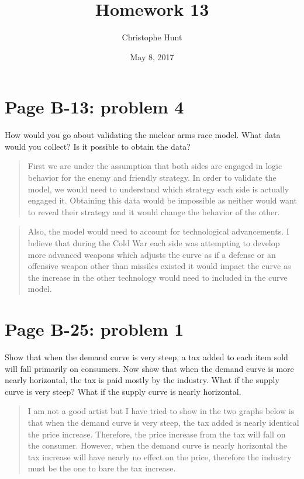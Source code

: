 \documentclass[]{article}
\title{Homework 13}
\author{Christophe Hunt}
\date{May 8, 2017}
\begin{document}
\maketitle

{
\setcounter{tocdepth}{2}
\tableofcontents
}
\newpage

\section{Page B-13: problem 4}\label{page-b-13-problem-4}

How would you go about validating the nuclear arms race model. What data
would you collect? Is it possible to obtain the data?

\begin{quote}
First we are under the assumption that both sides are engaged in logic
behavior for the enemy and friendly strategy. In order to validate the
model, we would need to understand which strategy each side is actually
engaged it. Obtaining this data would be impossible as neither would
want to reveal their strategy and it would change the behavior of the
other.
\end{quote}

\begin{quote}
Also, the model would need to account for technological advancements. I
believe that during the Cold War each side was attempting to develop
more advanced weapons which adjusts the curve as if a defense or an
offensive weapon other than missiles existed it would impact the curve
as the increase in the other technology would need to included in the
curve model.
\end{quote}

\section{Page B-25: problem 1}\label{page-b-25-problem-1}

Show that when the demand curve is very steep, a tax added to each item
sold will fall primarily on consumers. Now show that when the demand
curve is more nearly horizontal, the tax is paid mostly by the industry.
What if the supply curve is very steep? What if the supply curve is
nearly horizontal.

\begin{quote}
I am not a good artist but I have tried to show in the two graphs below
is that when the demand curve is very steep, the tax added is nearly
identical the price increase. Therefore, the price increase from the tax
will fall on the consumer. However, when the demand curve is nearly
horizontal the tax increase will have nearly no effect on the price,
therefore the industry must be the one to bare the tax increase.
\end{quote}
\end{document}
